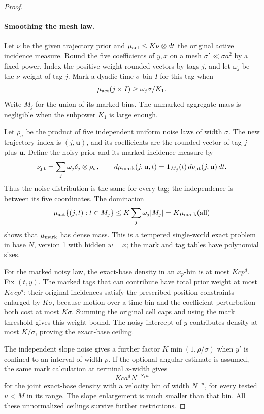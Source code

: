 \begin{proof}
\leavevmode\par
\paragraph{Smoothing the mesh law.}
Let \(\nu\) be the given trajectory prior and
\(\mu_{\rm act}\le K\nu\otimes dt\) the original active incidence
measure. Round the five coefficients of \(y,x\) on a mesh
\(\sigma'\ll\sigma a^2\) by a fixed power. Index the positive-weight
rounded vectors by tags \(j\), and let \(\omega_j\) be the
\(\nu\)-weight of tag \(j\). Mark a dyadic time \(\sigma\)-bin
\(I\) for this tag when
\[
 \mu_{\rm act}(j\times I)\ge \omega_j\sigma/K_1.
\]
Write \(M_j\) for the union of its marked bins. The unmarked
aggregate mass is negligible when the subpower \(K_1\) is large
enough.

Let \(\rho_\sigma\) be the product of five independent uniform
noise laws of width \(\sigma\). The new trajectory index is
\((j,\mathbf u)\), and its coefficients are the rounded vector
of tag \(j\) plus \(\mathbf u\). Define the noisy prior and its
marked incidence measure by
\[
 \nu_{\rm jit}=\sum_j\omega_j\delta_j\otimes\rho_\sigma,
 \qquad
 d\mu_{\rm mark}(j,\mathbf u,t)
   =\mathbf1_{M_j}(t)\,d\nu_{\rm jit}(j,\mathbf u)\,dt.
\]
Thus the noise distribution is the same for every tag; the
independence is between its five coordinates. The domination
\[
 \mu_{\rm act}\{(j,t):t\in M_j\}
 \le K\sum_j\omega_j|M_j|=K\mu_{\rm mark}(\mathrm{all})
\]
shows that \(\mu_{\rm mark}\) has dense mass. This is a tempered
single-world exact problem in base \(N\), version 1 with hidden
\(w=x\); the mark and tag tables have polynomial sizes.

For the marked noisy law, the exact-base density in an \(x_p\)-bin
is at most \(Kcp^d\).  Fix \((t,y)\).  The marked tags that can
contribute have total prior weight at most \(K\sigma cp^d\):
their original incidences satisfy the prescribed position constraints
enlarged by \(K\sigma\), because motion over a time bin and the
coefficient perturbation both cost at most \(K\sigma\).  Summing
the original cell caps and using the mark threshold gives this weight
bound.  The noisy intercept of \(y\) contributes density at most
\(K/\sigma\), proving the exact-base ceiling.

The independent slope noise gives a further factor
\(K\min(1,\rho/\sigma)\) when \(y'\) is confined to an interval
of width \(\rho\).  If the optional angular estimate is assumed,
the same mark calculation at terminal \(x\)-width gives
\[
 Kca^dN^{-S_1u}
\]
for the joint exact-base density with a velocity bin of width
\(N^{-u}\), for every tested \(u<M\) in its range.  The slope
enlargement is much smaller than that bin.  All these unnormalized
ceilings survive further restrictions.


\end{proof}
